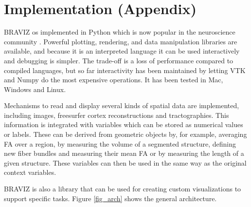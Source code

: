 \documentclass[utf8,paper]{frontiersSCNS} %
\begin{document}



\section*{Implementation (Appendix)}

BRAVIZ os implemented in Python which is now popular in the neuroscience community \citep{gorgolewski_nipype:_2011, garyfallidis_dipy_2014}.  Powerful plotting, rendering, and data manipulation libraries are available, and because it is an interpreted language it can be used interactively and debugging is simpler. The trade-off is a loss of performance compared to compiled languages, but so far interactivity has been maintained by letting VTK\citep{schroeder_vtk_1998} and Numpy\citep{van_der_walt_numpy_2011} do the most expensive operations. It has been tested in Mac, Windows and Linux.

Mechanisms to read and display several kinds of spatial data are implemented, including images, freesurfer \citep{fischl_freesurfer_2012} cortex reconstructions and tractographies. This information is integrated with variables which can be stored as numerical values or labels. These can be derived from geometric objects by, for example, averaging FA over a region, by measuring the volume of a segmented structure, defining new fiber bundles and measuring their mean FA or by measuring the length of a given structure. These variables can then be used in the same way as the original context variables.

BRAVIZ is also a library that can be used for creating custom visualizations to support specific tasks. Figure \ref{fig_arch} shows the general architecture.
\end{document}
